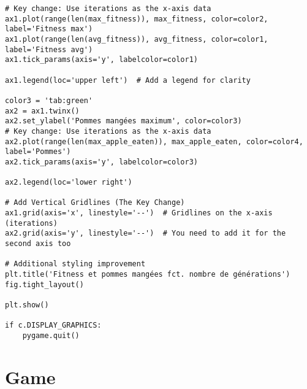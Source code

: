 \documentclass[11pt,a4paper]{article}
\begin{document}
\begin{verbatim}
# Key change: Use iterations as the x-axis data
ax1.plot(range(len(max_fitness)), max_fitness, color=color2, label='Fitness max')
ax1.plot(range(len(avg_fitness)), avg_fitness, color=color1, label='Fitness avg')
ax1.tick_params(axis='y', labelcolor=color1)

ax1.legend(loc='upper left')  # Add a legend for clarity

color3 = 'tab:green'
ax2 = ax1.twinx()
ax2.set_ylabel('Pommes mangées maximum', color=color3)
# Key change: Use iterations as the x-axis data
ax2.plot(range(len(max_apple_eaten)), max_apple_eaten, color=color4, label='Pommes')
ax2.tick_params(axis='y', labelcolor=color3)

ax2.legend(loc='lower right')

# Add Vertical Gridlines (The Key Change)
ax1.grid(axis='x', linestyle='--')  # Gridlines on the x-axis (iterations)
ax2.grid(axis='y', linestyle='--')  # You need to add it for the second axis too

# Additional styling improvement
plt.title('Fitness et pommes mangées fct. nombre de générations')
fig.tight_layout()

plt.show()

if c.DISPLAY_GRAPHICS:
    pygame.quit()

\end{verbatim}

\section{Game}
\end{document}

